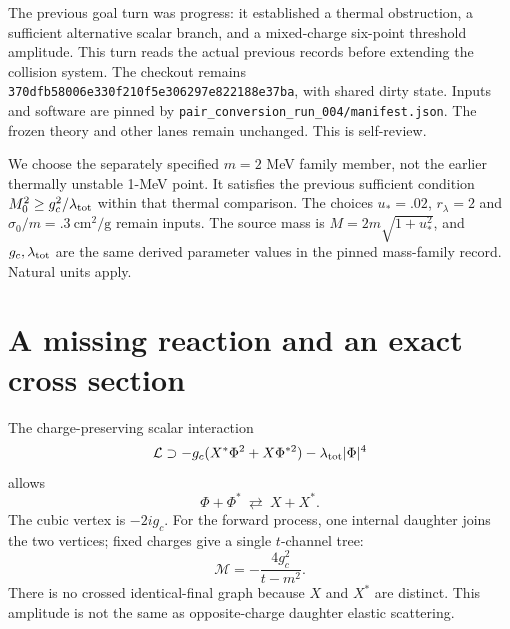 \documentclass[11pt]{article}
\begin{document}
The previous goal turn was progress: it established a thermal obstruction,
a sufficient alternative scalar branch, and a mixed-charge six-point
threshold amplitude. This turn reads the actual previous records before
extending the collision system. The checkout remains
\texttt{370dfb58006e330f210f5e306297e822188e37ba}, with shared dirty state.
Inputs and software are pinned by
\texttt{pair\_conversion\_run\_004/manifest.json}. The frozen theory and
other lanes remain unchanged. This is self-review.

We choose the separately specified $m=2$ MeV family member, not the earlier
thermally unstable 1-MeV point. It satisfies the previous sufficient
condition $M_0^2\ge g_c^2/\lambda_{\rm tot}$ within that thermal comparison.
The choices $u_*=.02$, $r_\lambda=2$ and
$\sigma_0/m=.3\ \mathrm{cm^2/g}$ remain inputs. The source mass is
$M=2m\sqrt{1+u_*^2}$, and $g_c,\lambda_{\rm tot}$ are the same derived
parameter values in the pinned mass-family record. Natural units apply.

\section{A missing reaction and an exact cross section}
The charge-preserving scalar interaction
\begin{equation}
 \mathcal L\supset-g_c(X^*\Phi^2+X\Phi^{*2})
 -\lambda_{\rm tot}|\Phi|^4
\end{equation}
allows
\begin{equation}
 \Phi+\Phi^*\ \rightleftarrows\ X+X^*.
\label{eq:pair}
\end{equation}
The cubic vertex is $-2ig_c$. For the forward process, one internal daughter
joins the two vertices; fixed charges give a single $t$-channel tree:
\begin{equation}
 \mathcal M=-\frac{4g_c^2}{t-m^2}.
\end{equation}
There is no crossed identical-final graph because $X$ and $X^*$ are distinct.
This amplitude is not the same as opposite-charge daughter elastic scattering.
\end{document}
